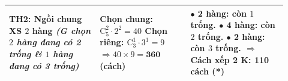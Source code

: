 \begin{ex}
{\begin{center}
\begin{tabular}{|p{0.3\linewidth}|p{0.3\linewidth}|p{0.32\linewidth}|}
				\textbf{TH2: Ngồi chung XS $2$ hàng} \newline
				\textit{(G chọn $2$ hàng đang có 2 trống \newline \& $1$ hàng đang có 3 trống)}
				& Chọn chung: $\mathrm{C}_5^2 \cdot 2^2 = 40$ \newline
				Chọn riêng: $\mathrm{C}_3^1 \cdot 3^1 = 9$ \newline
				$\Rightarrow 40 \times 9 = \mathbf{360}$ (cách)
				& $\bullet$ \textbf{2 hàng:} còn $1$ trống. \newline
				$\bullet$ \textbf{4 hàng:} còn $2$ trống. \newline
				$\bullet$ \textbf{2 hàng:} còn $3$ trống. \newline
				$\Rightarrow$ Cách xếp 2 K: \textbf{110 cách (*)} \\ \hline
				

\end{tabular}
\end{center}}
\end{ex}

